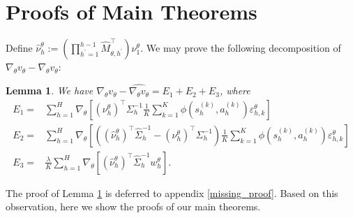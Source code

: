 \documentclass{article}
\newtheorem{lemma}{Lemma}[section]
\numberwithin{equation}{section}
\begin{document}

\section{Proofs of Main Theorems}
Define $\widehat{\nu}^\theta_h:=\left(\prod_{h^\prime=1}^{h-1}\widehat{M}_{\theta,h^\prime}^\top\right)\nu_1^\theta$.  We may prove the following decomposition of $\nabla_\theta v_\theta-\widehat{\nabla_\theta v_\theta}$:
\begin{lemma}
\label{error_decomp}
We have $\nabla_\theta v_\theta-\widehat{\nabla_\theta v_\theta}=E_1+E_2+E_3$, where 
\begin{align*}
    E_1=&\sum_{h=1}^H\nabla_\theta\left[\left(\nu^\theta_h\right)^\top\Sigma^{-1}_h\frac{1}{K}\sum_{k=1}^K\phi\left(s_h^{(k)},a_h^{(k)}\right)\varepsilon_{h,k}^\theta\right]\\
    E_2=&\sum_{h=1}^H\nabla_\theta\left[\left(\left(\widehat{\nu}^\theta_h\right)^\top\widehat{\Sigma}_h^{-1}-\left(\nu^\theta_h\right)^\top\Sigma_h^{-1}\right)\frac{1}{K}\sum_{k=1}^K\phi\left(s_h^{(k)},a_h^{(k)}\right)\varepsilon_{h,k}^\theta\right]\\
    E_3=&\frac{\lambda}{K}\sum_{h=1}^H\nabla_\theta\left[\left(\widehat{\nu}^\theta_h\right)^\top\widehat{\Sigma}_h^{-1}w_h^\theta\right].
\end{align*}
\end{lemma}
The proof of Lemma \ref{error_decomp} is deferred to appendix \ref{missing_proof}. Based on this observation, here we show the proofs of our main theorems. 
\end{document}
